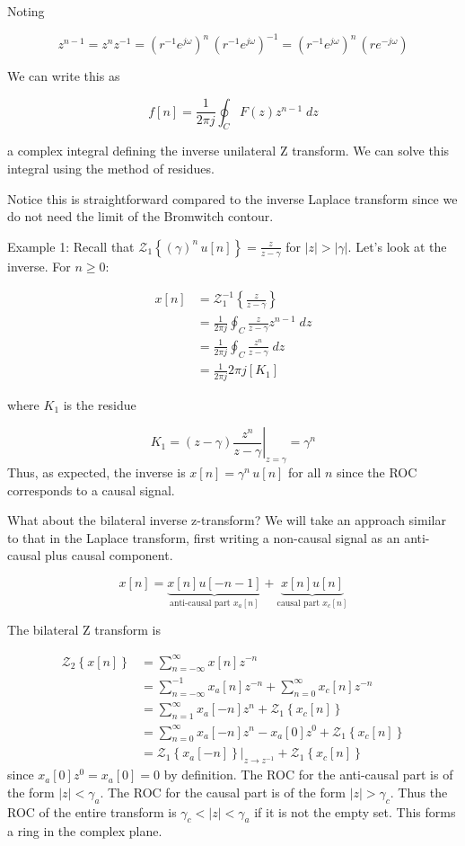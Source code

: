 \documentclass{article}
\begin{document}
Noting

$$
z^{n-1} = z^n z^{-1} = \left(r^{-1}e^{j\omega} \right)^n \, \left(r^{-1}e^{j\omega} \right)^{-1} = \left(r^{-1}e^{j\omega} \right)^n \, \left(re^{-j\omega} \right) 
$$

We can write this as

$$
f[n]= \frac{1}{2 \pi j} \oint_C F(z) z^{n-1}\; dz
$$

a complex integral defining the inverse unilateral Z transform. We can solve this integral using the method of residues.

Notice this is straightforward compared to the inverse Laplace transform since we do not need the limit of the Bromwitch contour.

Example 1: Recall that $\mathcal{Z}_1\left\{(\gamma)^n\, u[n]\right\} = \frac{z}{z-\gamma}$ for $|z| > |\gamma|$. Let's look at the inverse. For $n \geq 0$:

$$
\begin{aligned}
  x[n] &= \mathcal{Z}_1^{-1}\left\{\frac{z}{z-\gamma}\right\}\\
  &= \frac{1}{2 \pi j} \oint_C  \frac{z}{z-\gamma}  z^{n-1}\; dz\\
  &= \frac{1}{2 \pi j} \oint_C  \frac{z^n}{z-\gamma}\; dz\\
  &= \frac{1}{2 \pi j} 2 \pi j [K_1] 
\end{aligned}
$$

where $K_1$ is the residue

$$
K_1 = \left. (z-\gamma)\frac{z^n}{z-\gamma}\right|_{z = \gamma} = \gamma^n
$$
Thus, as expected, the inverse is $x[n] = \gamma^n\, u[n]$ for all $n$ since the ROC corresponds to a causal signal.

What about the bilateral inverse z-transform? We will take an approach similar to that in the Laplace transform, first writing a non-causal signal as an anti-causal plus causal component.

$$
x[n] = \underbrace{x[n] u[-n-1]}_{\text{anti-causal part } x_a[n]} +  \underbrace{x[n] u[n]}_{\text{causal part } x_c[n]} 
$$

The bilateral Z transform is

$$
\begin{aligned}
  \mathcal{Z}_2\left\{x[n]\right\} &= \sum\limits_{n = -\infty}^{\infty} x[n] z^{-n}\\
  &= \sum\limits_{n = -\infty}^{-1} x_a[n] z^{-n} + \sum\limits_{n = 0}^{\infty} x_c[n] z^{-n}\\
  &= \sum\limits_{n = 1}^{\infty} x_a[-n] z^{n} + \mathcal{Z}_1\left\{x_c[n]\right\}\\
  &= \sum\limits_{n = 0}^{\infty} x_a[-n] z^{n} - x_a[0] z^{0} + \mathcal{Z}_1\left\{x_c[n]\right\}\\
  &= \left. \mathcal{Z}_1\left\{x_a[-n]\right\}\right|_{z \rightarrow z^{-1}} + \mathcal{Z}_1\left\{x_c[n]\right\}
\end{aligned}
$$
since $x_a[0] z^{0} = x_a[0] = 0$ by definition. The ROC for the anti-causal part is of the form $|z| < \gamma_a$. The ROC for the causal part is of the form $|z| > \gamma_c$. Thus the ROC of the entire transform is $\gamma_c < |z| < \gamma_a$ if it is not the empty set. This forms a ring in the complex plane.
\end{document}
